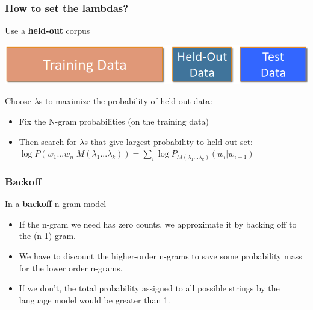 \documentclass[13.5pt,aspecratio=169]{beamer}
\begin{document}
\begin{frame}
    \onehalfspacing
        \frametitle{How to set the lambdas?}
        {\Large Use a \textbf{held-out} corpus}
        \begin{minipage}{0.75\textwidth}
           \centering
           \includegraphics[scale=0.5]{held_out_corpus.png}
        \end{minipage}

        \vspace{3em}
        \begin{block}{Choose $\lambda$s to maximize the probability of held-out data:}
        \begin{itemize}
            \item Fix the N-gram probabilities (on the training data)
            \item Then search for $\lambda$s that give largest probability to held-out set: \\ \vspace{1em}
            \hspace{1.5em} $ \log{P(w_1 ... w_n | M(\lambda_1 ... \lambda_k))} = \sum_{i} \log{P_{M(\lambda_1 ... \lambda_k)} (w_i | w_{i-1})} $
        \end{itemize}
        \end{block}
    
       
    \end{frame}
    

\begin{frame}
    \onehalfspacing
        \frametitle{Backoff}
        \begin{block}{In a \textbf{backoff} n-gram model}
            \begin{itemize}
                \item If the n-gram we need has zero counts, we approximate it by backing off to the (n-1)-gram.
                \item We have to discount the higher-order n-grams to save some probability mass for the lower order n-grams.
                \item If we don’t, the total probability assigned to all possible strings by the language model would be greater than 1.
            \end{itemize}
        \end{block}
    
        
\end{frame}
\end{document}
